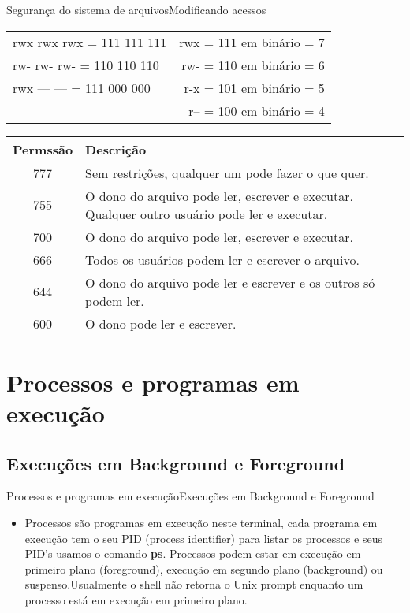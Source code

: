 \documentclass{beamer}
\begin{document}
\begin{frame}{Seguran\c{c}a do sistema de arquivos}{Modificando acessos}
  \begin{center}
 \begin{tabular}{l | r} 
 rwx rwx rwx = 111 111 111 & rwx = 111 em binário = 7\\ 
 rw- rw- rw- = 110 110 110 & rw- = 110 em binário = 6\\
 rwx --- --- = 111 000 000 & r-x = 101 em binário = 5\\
 & r-- = 100 em binário = 4\\
\end{tabular}
\end{center}

  \begin{center}
 \begin{tabular}{||c | p{9cm}||} 
 \hline
 \textbf{Permssão} & \textbf{Descri\c{c}ão}\\ [0.5ex] 
 \hline\hline
 777 & Sem restrições, qualquer um pode fazer o que quer.\\ 
 \hline
 755 & O dono do arquivo pode ler, escrever e executar. Qualquer outro usuário pode ler e executar.\\
 \hline
 700 & O dono do arquivo pode ler, escrever e executar.\\
 \hline
 666 & Todos os usuários podem ler e escrever o arquivo.\\
 \hline
 644 & O dono do arquivo pode ler e escrever e os outros só podem ler.\\
 \hline
 600 & O dono pode ler e escrever.\\
 \hline
\end{tabular}
\end{center}
\end{frame}

\section{Processos e programas em execu\c{c}ão}
\subsection{Execu\c{c}ões em Background e Foreground}
\begin{frame}{Processos e programas em execu\c{c}ão}{Execu\c{c}ões em Background e Foreground}
  \begin{itemize}
  \item { Processos são programas em execu\c{c}ão neste terminal, cada programa em execu\c{c}ão tem o seu PID (process identifier) para listar os processos e seus PID's usamos o comando \textbf{ps}. Processos podem estar em execu\c{c}ão em primeiro plano (foreground), execu\c{c}ão em segundo plano (background) ou suspenso.Usualmente o shell não retorna o Unix prompt enquanto um processo está em execu\c{c}ão em primeiro plano.
    }\end{itemize}
\end{frame}
\end{document}
